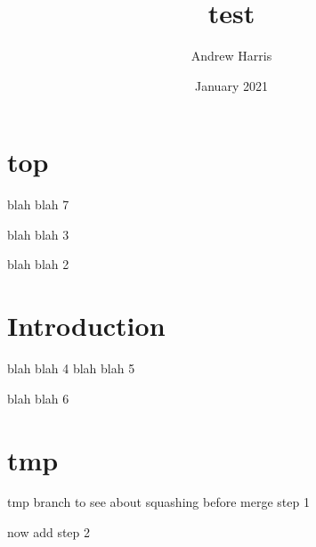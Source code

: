 \documentclass{article}
\title{test}
\author{Andrew Harris}
\date{January 2021}
\begin{document}
\maketitle
\section{top} 
blah blah 7

blah blah 3

blah blah 2


\section{Introduction}
blah blah 4
blah blah 5

blah blah 6

\section{tmp}

tmp branch to see about squashing before merge step 1

now add step 2
\end{document}
